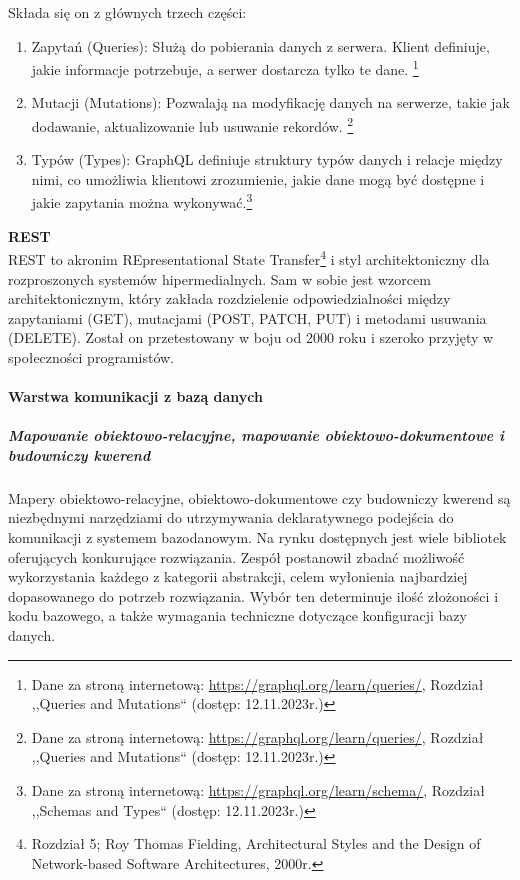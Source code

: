 \documentclass[12pt, a4paper, twoside, openany]{book}
\newcommand{\forceindent}{\leavevmode{\parindent=1.3em\indent}}
\begin{document}
Składa się on z głównych trzech części:
\begin{enumerate}
    \item Zapytań (Queries): Służą do pobierania danych z serwera. Klient definiuje, jakie informacje potrzebuje, a serwer dostarcza tylko te dane. \footnote{Dane za stroną internetową: \url{https://graphql.org/learn/queries/}, Rozdział ,,Queries and Mutations`` (dostęp: 12.11.2023r.)}
    \item Mutacji (Mutations): Pozwalają na modyfikację danych na serwerze, takie jak dodawanie, aktualizowanie lub usuwanie rekordów. \footnote{Dane za stroną internetową: \url{https://graphql.org/learn/queries/}, Rozdział ,,Queries and Mutations`` (dostęp: 12.11.2023r.)}
    \item Typów (Types): GraphQL definiuje struktury typów danych i relacje między nimi, co umożliwia klientowi zrozumienie, jakie dane mogą być dostępne i jakie zapytania można wykonywać.\footnote{Dane za stroną internetową: \url{https://graphql.org/learn/schema/}, Rozdział ,,Schemas and Types`` (dostęp: 12.11.2023r.)}
\end{enumerate}

\textbf{REST}\\
\forceindent REST to akronim REpresentational State Transfer\footnote{Rozdział 5; Roy Thomas Fielding, Architectural Styles and the Design of Network-based Software Architectures, 2000r.} i styl architektoniczny dla rozproszonych systemów hipermedialnych. Sam w sobie jest wzorcem architektonicznym, który zakłada rozdzielenie odpowiedzialności między zapytaniami (GET), mutacjami (POST, PATCH, PUT) i metodami usuwania (DELETE). Został on przetestowany w boju od 2000 roku i szeroko przyjęty w społeczności programistów.

\paragraph{Warstwa komunikacji z bazą danych}
\subparagraph{Mapowanie obiektowo-relacyjne, mapowanie obiektowo-dokumentowe i budowniczy kwerend\\}
\forceindent  Mapery obiektowo-relacyjne, obiektowo-dokumentowe czy budowniczy kwerend są niezbędnymi narzędziami do utrzymywania deklaratywnego podejścia do komunikacji z systemem bazodanowym.
Na rynku dostępnych jest wiele bibliotek oferujących konkurujące rozwiązania.
Zespół postanowił zbadać możliwość wykorzystania każdego z kategorii abstrakcji, celem wyłonienia najbardziej dopasowanego do potrzeb rozwiązania.
Wybór ten determinuje ilość złożoności i kodu bazowego, a także wymagania techniczne dotyczące konfiguracji bazy danych.
\end{document}
